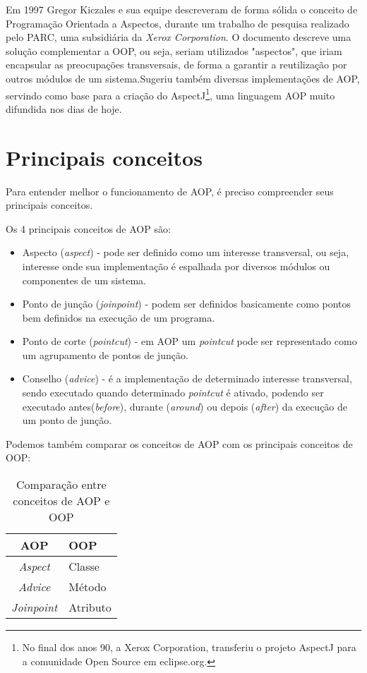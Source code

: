 \documentclass[tc,openright]{iiufrgs}
\begin{document}
Em 1997 Gregor Kiczales e sua equipe descreveram de forma sólida o conceito de Programação Orientada a Aspectos, durante um trabalho de pesquisa realizado pelo PARC, uma subsidiária da \textit{Xerox Corporation}. O documento descreve uma solução complementar a OOP, ou seja, seriam utilizados "aspectos", que iriam encapsular as preocupações transversais, de forma a garantir a reutilização por outros módulos de um sistema.Sugeriu também diversas implementações de AOP, servindo como base para a criação do AspectJ\footnote{No final dos anos 90, a Xerox Corporation, transferiu o projeto AspectJ para a comunidade Open Source em eclipse.org.}, uma linguagem AOP muito difundida nos dias de hoje.\cite{groves2013aop}

\section{Principais conceitos}

Para entender melhor o funcionamento de AOP, é preciso compreender seus principais conceitos. 

Os 4 principais conceitos de AOP são:

\begin{itemize}
\item Aspecto (\textit{aspect}) - pode ser definido como um interesse transversal, ou seja, interesse onde sua implementação é espalhada por diversos módulos ou componentes de um sistema.
\item Ponto de junção (\textit{joinpoint}) - podem ser definidos basicamente como pontos bem definidos na execução de um programa.
\item Ponto de corte (\textit{pointcut}) - em AOP um \textit{pointcut} pode ser representado como um agrupamento de pontos de junção.
\item Conselho (\textit{advice}) - é a implementação de determinado interesse transversal, sendo executado quando determinado \textit{pointcut} é ativado, podendo ser executado antes(\textit{before}), durante (\textit{around}) ou depois (\textit{after}) da execução de um ponto de junção.
\end{itemize}

Podemos também comparar os conceitos de AOP com os principais conceitos de OOP:

\begin{table}[ht]
	\centering
	\caption{Comparação entre conceitos de AOP e OOP}
	\begin{tabular}[h]{c l}
		\hline 
		\textbf{AOP} & \textbf{OOP} \\
		\hline
		\textit{Aspect}&Classe \\
		\textit{Advice}&Método \\
		\textit{Joinpoint}&Atributo \\
		\hline
	\end{tabular}
	\label{tab:classificacaoEtq}
\end{table}
\end{document}

